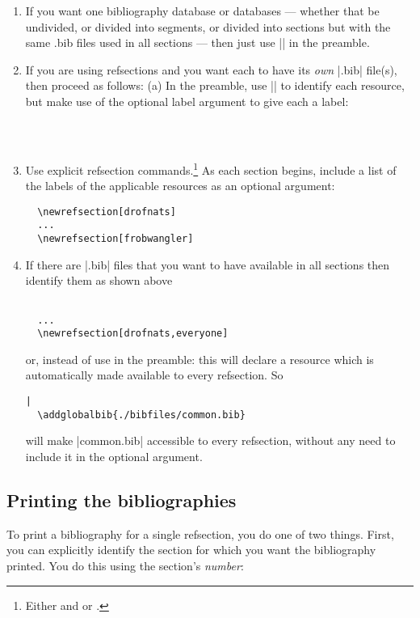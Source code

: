 \begin{enumerate}
\item If you want one bibliography database or databases --- whether
  that be undivided, or divided into segments, or divided into
  sections but with the same .bib files used in all sections --- then
  just use || in the preamble.
\item
  If you are using refsections and you want each to have its \emph{own}
  |.bib| file(s), then proceed as follows: (a) In the preamble, use
  || to identify each resource, but make use of the
  optional label argument to give each a label:
\begin{verbatim}
  
  
\end{verbatim}
\item  
  Use explicit refsection commands.\footnote{Either  and  or .} As each section begins, include a
  list of the labels of the applicable resources as an optional
  argument:
\begin{verbatim}
  \newrefsection[drofnats]
  ... 
  \newrefsection[frobwangler]
\end{verbatim}
\item
  If there are |.bib| files that you want to have available in all
  sections then identify them as shown above
\begin{verbatim}
  
  ...
  \newrefsection[drofnats,everyone]
\end{verbatim}
  or, instead of  use
   in the preamble: this will
  declare a resource which is automatically made available to every
  refsection. So
\begin{verbatim}|
  \addglobalbib{./bibfiles/common.bib}
\end{verbatim} 
will make |common.bib| accessible to every refsection, without any need to include it in the optional argument.
\end{enumerate}
\subsection{Printing the bibliographies}

To print a bibliography for a single refsection, you do one of two
things. First, you can explicitly identify the section for which you
want the bibliography printed. You do this using the section's
\emph{number}:

